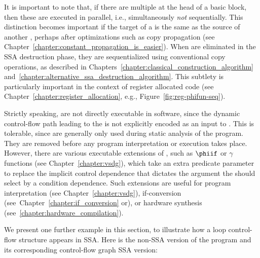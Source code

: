 It is important to note that, if there are multiple \phifuns{}
at the head of a basic block, then these are executed in parallel, 
i.e., simultaneously \textit{not} sequentially.
This distinction becomes important if the target of a \phifun
is the same as the source of another \phifun, perhaps after
optimizations such as copy propagation
(see Chapter~\ref{chapter:constant_propagation_is_easier}).
When \phifuns are eliminated in the SSA destruction phase,
they are sequentialized using conventional 
copy operations,
as described in Chapters~\ref{chapter:classical_construction_algorithm} and~\ref{chapter:alternative_ssa_destruction_algorithm}. This subtlety is particularly important in the context of register allocated code (see Chapter~\ref{chapter:register_allocation}, e.g., Figure~\ref{fig:reg-phifun-seq}).



Strictly speaking, \phifuns are not directly executable in software,
since the dynamic control-flow path leading to the \phifun
is not explicitly encoded as an input to \phifun.
This is tolerable, since \phifuns are generally only 
used during static analysis of the program. They are removed
before any program interpretation or execution takes place.
However, there are various executable extensions of \phifuns, 
such as $\phiif$ or $\gamma$ functions (see Chapter~\ref{chapter:vsdg}), which take
an extra predicate parameter to replace the implicit
control dependence that dictates the argument the \phifun should select by a condition dependence. Such extensions are useful for program interpretation (see Chapter~\ref{chapter:vsdg}), if-conversion (see~Chapter~\ref{chapter:if_conversion} or), or hardware synthesis (see~\ref{chapter:hardware_compilation}).



We present one further example in this section,
to illustrate how a loop control-flow structure appears in SSA.
Here is the non-SSA version of the program and its corresponding control-flow graph SSA version:
\medskip

